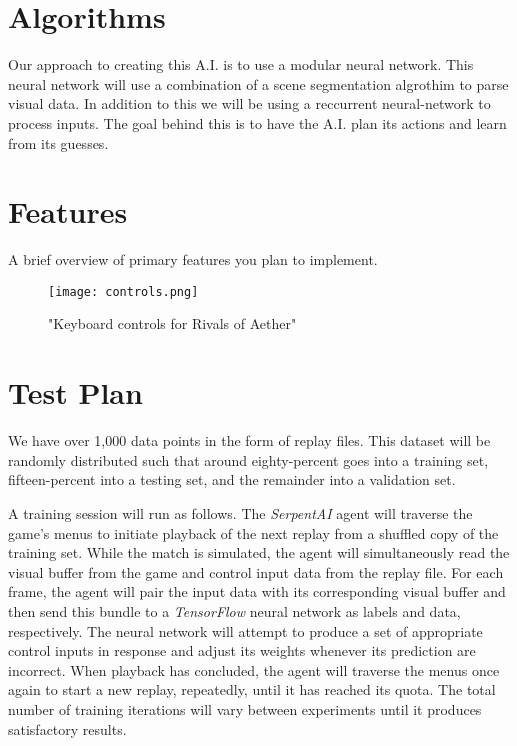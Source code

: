 


\section{Algorithms}


Our approach to creating this A.I. is to use a modular neural network. This neural network will use a combination of a scene segmentation algrothim to parse visual data. In addition to this we will be using a reccurrent neural-network to process inputs. The goal behind this is to have the A.I. plan its actions and learn from its guesses. 




\section{Features}

A brief overview of primary features you plan to implement.

\begin{figure}
	\caption{"Keyboard controls for Rivals of Aether"}
	\centering
	\texttt{[image: controls.png]} \\
\end{figure}




\section{Test Plan}

We have over 1,000 data points in the form of replay files. This dataset will be randomly distributed such that around eighty-percent goes into a training set, fifteen-percent into a testing set, and the remainder into a validation set.

A training session will run as follows. The {\it SerpentAI} agent will traverse the game's menus to initiate playback of the next replay from a shuffled copy of the training set. While the match is simulated, the agent will simultaneously read the visual buffer from the game and control input data from the replay file. For each frame, the agent will pair the input data with its corresponding visual buffer and then send this bundle to a {\it TensorFlow} neural network as labels and data, respectively. The neural network will attempt to produce a set of appropriate control inputs in response and adjust its weights  whenever its prediction are incorrect. When playback has concluded, the agent will traverse the menus once again to start a new replay, repeatedly, until it has reached its quota. The total number of training iterations will vary between experiments until it produces satisfactory results.

